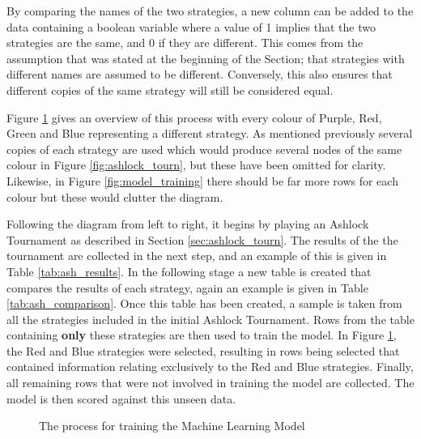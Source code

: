 By comparing the names of the two strategies, a new column can be added to the data containing a boolean variable where a value of 1 implies that the two strategies are the same, and 0 if they are different.
This comes from the assumption that was stated at the beginning of the Section; that strategies with different names are assumed to be different.
Conversely, this also ensures that different copies of the same strategy will still be considered equal.

Figure \ref{fig:ml_process} gives an overview of this process with every colour of \textcolor{sol-violet}{Purple}, \textcolor{sol-red}{Red}, \textcolor{sol-green}{Green} and \textcolor{sol-blue}{Blue} representing a different strategy.
As mentioned previously several copies of each strategy are used which would produce several nodes of the same colour in Figure \ref{fig:ashlock_tourn}, but these have been omitted for clarity.
Likewise, in Figure \ref{fig:model_training} there should be far more rows for each colour but these would clutter the diagram.

Following the diagram from left to right, it begins by playing an Ashlock Tournament as described in Section \ref{sec:ashlock_tourn}.
The results of the the tournament are collected in the next step, and an example of this is given in Table \ref{tab:ash_results}.
In the following stage a new table is created that compares the results of each strategy, again an example is given in Table \ref{tab:ash_comparison}.
Once this table has been created, a sample is taken from all the strategies included in the initial Ashlock Tournament.
Rows from the table containing \textbf{only} these strategies are then used to train the model.
In Figure \ref{fig:ml_process}, the \textcolor{sol-red}{Red} and \textcolor{sol-blue}{Blue} strategies were selected, resulting in rows being selected that contained information relating exclusively to the \textcolor{sol-red}{Red} and \textcolor{sol-blue}{Blue} strategies.
Finally, all remaining rows that were not involved in training the model are collected.
The model is then scored against this unseen data.

\begin{figure}
    \centering
    \caption{The process for training the Machine Learning Model}
    \label{fig:ml_process}
\end{figure}



